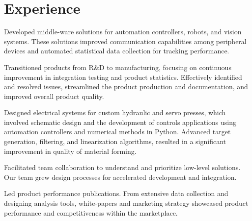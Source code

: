 \documentclass{TaylorTurnerResume2023}
\begin{document}

\begin{minipage}[t]{0.7\textwidth} 

\section{Experience}
\vspace{\topsep}
\begin{tightemize}
\sectionsep
\item Developed middle-ware solutions for automation controllers, robots, and vision systems. These solutions improved communication capabilities among peripheral devices and automated statistical data collection for tracking performance.
\item Transitioned products from R\&D to manufacturing, focusing on continuous improvement in integration testing and product statistics. Effectively identified and resolved issues, streamlined the product production and documentation, and improved overall product quality. 
\end{tightemize}
\sectionsep

\begin{tightemize}
\sectionsep
\item Designed electrical systems for custom hydraulic and servo presses, which involved schematic design and the development of controls applications using automation controllers and numerical methods in Python. Advanced target generation, filtering, and linearization algorithms, resulted in a significant improvement in quality of material forming.
\item Facilitated team collaboration to understand and prioritize low-level solutions. Our team grew design processes for accelerated development and integration. 
\item Led product performance publications. From extensive data collection and designing analysis tools, white-papers and marketing strategy showcased product performance and competitiveness within the marketplace. 
\end{tightemize}
\sectionsep


\end{minipage}
\end{document}
